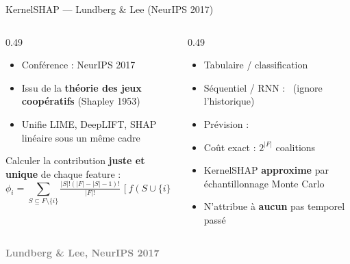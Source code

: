 \documentclass[10pt]{beamer}
\newcommand{\source}[1]{\vspace{4pt}\hfill{\textcolor{gray}{\textbf{\tiny #1}}}}
\begin{document}
\begin{frame}{KernelSHAP — Lundberg \& Lee (NeurIPS 2017)}
  \begin{columns}
    \begin{column}{0.49\textwidth}
      \begin{ctxbox}
        \begin{itemize}
          \item Conférence : NeurIPS 2017
          \item Issu de la \textbf{théorie des jeux coopératifs} (Shapley 1953)
          \item Unifie LIME, DeepLIFT, SHAP linéaire sous un même cadre
        \end{itemize}
      \end{ctxbox}
      \begin{probbox}
        Calculer la contribution \textbf{juste et unique} de chaque feature :
        \[
          \phi_i = \!\!\sum_{S \subseteq F\setminus\{i\}}\!
          \tfrac{|S|!(|F|-|S|-1)!}{|F|!}\, [f(S\cup\{i\}) - f(S)]
        \]
      \end{probbox}
    \end{column}
    \begin{column}{0.49\textwidth}
      \begin{transposbox}
        \begin{itemize}
          \item Tabulaire / classification \checkmark
          \item Séquentiel / RNN : \texttimes\ (ignore l'historique)
          \item Prévision : \texttimes
        \end{itemize}
      \end{transposbox}
      \begin{limitbox}
        \begin{itemize}
          \item Coût exact : $2^{|F|}$ coalitions
          \item KernelSHAP \textbf{approxime} par échantillonnage Monte Carlo
          \item N'attribue à \textbf{aucun} pas temporel passé
        \end{itemize}
      \end{limitbox}
    \end{column}
  \end{columns}
  \source{Lundberg \& Lee, NeurIPS 2017}
\end{frame}
\end{document}
